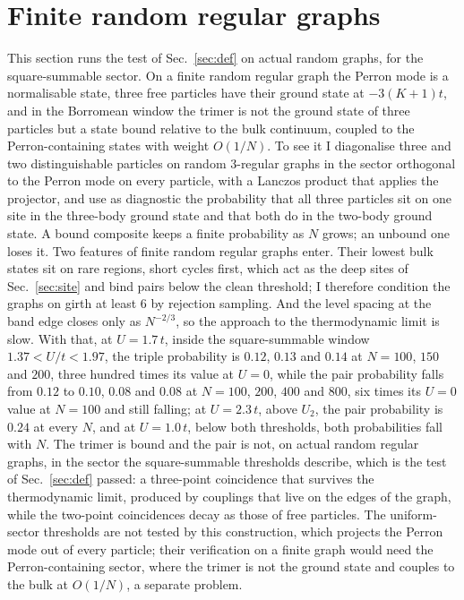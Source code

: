 \documentclass[aps,pre,twocolumn,superscriptaddress,floatfix]{revtex4-2}
\newcommand{\Up}{U_{2}}
\begin{document}
\section{Finite random regular graphs}
\label{sec:rrg}
This section runs the test of Sec.~\ref{sec:def} on actual random graphs, for the square-summable sector.
On a finite random regular graph the Perron mode is a normalisable state,
three free particles have their ground state at $-3(K+1)t$, and in the
Borromean window the trimer is not the ground state of three particles but
a state bound relative to the bulk continuum, coupled to the
Perron-containing states with weight $O(1/N)$. To see it I diagonalise
three and two distinguishable particles on random $3$-regular graphs in
the sector orthogonal to the Perron mode on every particle, with a Lanczos
product that applies the projector, and use as diagnostic the probability
that all three particles sit on one site in the three-body ground state
and that both do in the two-body ground state. A bound composite keeps a
finite probability as $N$ grows; an unbound one loses it. Two features of
finite random regular graphs enter. Their lowest bulk states sit on rare
regions, short cycles first, which act as the deep sites of
Sec.~\ref{sec:site} and bind pairs below the clean threshold; I therefore
condition the graphs on girth at least $6$ by rejection sampling. And the
level spacing at the band edge closes only as $N^{-2/3}$, so the approach
to the thermodynamic limit is slow. With that, at $U=1.7\,t$, inside the
square-summable window $1.37<U/t<1.97$, the triple probability is $0.12$,
$0.13$ and $0.14$ at $N=100$, $150$ and $200$, three hundred times its
value at $U=0$, while the pair probability falls from $0.12$ to $0.10$,
$0.08$ and $0.08$ at $N=100$, $200$, $400$ and $800$, six times its
$U=0$ value at $N=100$ and still falling; at $U=2.3\,t$, above $\Up$, the
pair probability is $0.24$ at every $N$, and at $U=1.0\,t$, below both
thresholds, both probabilities fall with $N$. The trimer is bound and the
pair is not, on actual random regular graphs, in the sector the
square-summable thresholds describe, which is the test of
Sec.~\ref{sec:def} passed: a three-point coincidence that survives the
thermodynamic limit, produced by couplings that live on the edges of the
graph, while the two-point coincidences decay as those of free
particles. The uniform-sector thresholds are not tested by this
construction, which projects the Perron mode out of every particle;
their verification on a finite graph would need the Perron-containing
sector, where the trimer is not the ground state and couples to the
bulk at $O(1/N)$, a separate problem.
\end{document}
